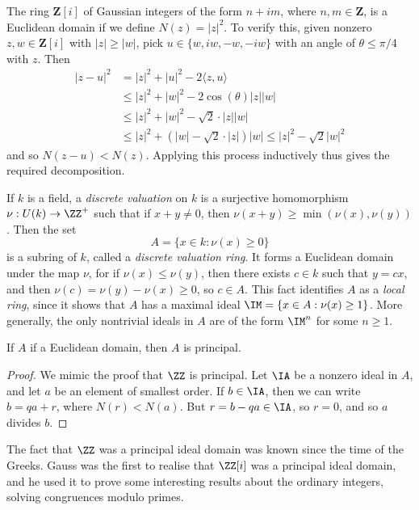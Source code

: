 \begin{example}
    The ring $\mathbf{Z}[i]$ of Gaussian integers of the form $n + im$, where $n,m \in \mathbf{Z}$, is a Euclidean domain if we define $N(z) = |z|^2$. To verify this, given nonzero $z,w \in \mathbf{Z}[i]$ with $|z| \geq |w|$, pick $u \in \{ w, iw, -w, -iw \}$ with an angle of $\theta \leq \pi/4$ with $z$. Then
    \begin{align*}
        |z - u|^2 &= |z|^2 + |u|^2 - 2 \langle z, u \rangle\\
        &\leq |z|^2 + |w|^2 - 2 \cos(\theta) |z||w|\\
        &\leq |z|^2 + |w|^2 - \sqrt{2} \cdot |z||w|\\
        &\leq |z|^2 + (|w| - \sqrt{2} \cdot |z|) |w| \leq |z|^2 - \sqrt{2} |w|^2
    \end{align*}
    and so $N(z-u) < N(z)$. Applying this process inductively thus gives the required decomposition.
\end{example}

\begin{example}
    If $k$ is a field, a \emph{discrete valuation} on $k$ is a surjective homomorphism $\nu: U(k) \to \ZZ^+$ such that if $x + y \neq 0$, then $\nu(x + y) \geq \min(\nu(x),\nu(y))$. Then the set
    \[ A = \{ x \in k: \nu(x) \geq 0 \} \]
    is a subring of $k$, called a \emph{discrete valuation ring}. It forms a Euclidean domain under the map $\nu$, for if $\nu(x) \leq \nu(y)$, then there exists $c \in k$ such that $y = cx$, and then $\nu(c) = \nu(y) - \nu(x) \geq 0$, so $c \in A$. This fact identifies $A$ as a \emph{local ring}, since it shows that $A$ has a maximal ideal $\IM = \{ x \in A: \nu(x) \geq 1 \}$. More generally, the only nontrivial ideals in $A$ are of the form $\IM^n$ for some $n \geq 1$.
\end{example}

\begin{theorem}
    If $A$ if a Euclidean domain, then $A$ is principal.
\end{theorem}
\begin{proof}
    We mimic the proof that $\ZZ$ is principal. Let $\IA$ be a nonzero ideal in $A$, and let $a$ be an element of smallest order. If $b \in \IA$, then we can write $b = qa + r$, where $N(r) < N(a)$. But $r = b - qa \in \IA$, so $r = 0$, and so $a$ divides $b$.
\end{proof}

The fact that $\ZZ$ was a principal ideal domain was known since the time of the Greeks. Gauss was the first to realise that $\ZZ[i]$ was a principal ideal domain, and he used it to prove some interesting results about the ordinary integers, solving congruences modulo primes.

